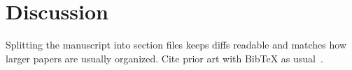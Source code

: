 \section{Discussion}
\label{sec:discussion}

Splitting the manuscript into section files keeps diffs readable and matches how
larger papers are usually organized. Cite prior art with BibTeX as usual~\cite{knuth84,lamport94}.
